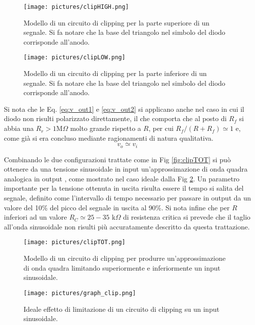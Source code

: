 \documentclass[a4paper,11pt]{article}
\begin{document}
	\begin{figure}
		\centering
		\begin{minipage}{0.45\textwidth}
			\centering
			\texttt{[image: pictures/clipHIGH.png]}
			\caption{Modello di un circuito di clipping per la parte superiore di un segnale. Si fa notare che la base del triangolo nel simbolo del diodo corrisponde all'anodo.}
			\label{fig:clipHIGH}
		\end{minipage}
		\hfill
		\begin{minipage}{0.445\textwidth}
			\centering
			\texttt{[image: pictures/clipLOW.png]}
			\caption{Modello di un circuito di clipping per la parte inferiore di un segnale. Si fa notare che la base del triangolo nel simbolo del diodo corrisponde all'anodo.}
			\label{fig:clipLOW}
		\end{minipage}%
	\end{figure}
	
	Si nota che le Eq. \ref{eq:v_out1} e \ref{eq:v_out2} si applicano anche nel caso in cui il diodo non risulti polarizzato direttamente, il che comporta che al posto di $R_f$ si abbia una $R_r > 1$M$\Omega$ molto grande rispetto a $R$, per cui $R_f/(R+R_f) \simeq 1$ e, come già si era concluso mediante ragionamenti di natura qualitativa.$$ v_o \simeq v_i$$ 
	
	Combinando le due configurazioni trattate come in Fig \ref{fig:clipTOT} si può ottenere da una tensione sinusoidale in input un'approssimazione di onda quadra analogica in output \cite{clipper}, come mostrato nel caso ideale dalla Fig \ref{fig:graph_clip}. Un parametro importante per la tensione ottenuta in uscita risulta essere il tempo si salita del segnale, definito come l'intervallo di tempo necessario per passare in output da un valore del 10\% del picco del segnale in uscita al 90\%. Si nota infine che per $R$ inferiori ad un valore $R_C \simeq 25-35$ k$\Omega$ di resistenza critica si prevede che il taglio all'onda sinusoidale non risulti più accuratamente descritto da questa trattazione. 
	
	
	
	\begin{figure}
		\centering
		\begin{minipage}{0.45\textwidth}
			\centering
			\texttt{[image: pictures/clipTOT.png]}
			\caption{Modello di un circuito di clipping per produrre un'approssimazione di onda quadra limitando superiormente e inferiormente un input sinusoidale.}
			\label{fig:clipTOT}
		\end{minipage}
		\hfill
		\begin{minipage}{0.45\textwidth}
			\centering
			\texttt{[image: pictures/graph\_clip.png]}
			\caption{Ideale effetto di limitazione di un circuito di clipping su un input sinusoidale.}
			\label{fig:graph_clip}
		\end{minipage}%
	\end{figure}
	
\end{document}
